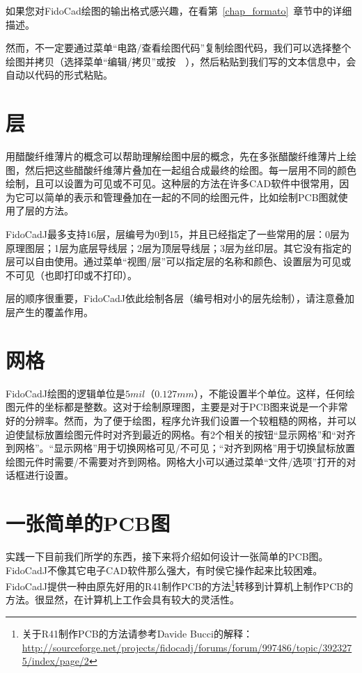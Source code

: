 \documentclass[10pt,a4paper,twoside]{scrreprt}
\newcommand{\keyevidence}[1]{\fbox{#1}}
\begin{document}
如果您对FidoCad绘图的输出格式感兴趣，在看第~\ref{chap_formato}~章节中的详细描述。

然而，不一定要通过菜单{}“电路/查看绘图代码”复制绘图代码，我们可以选择整个绘图并拷贝（选择菜单“编辑/拷贝”或按~\keyevidence{Ctrl+C}~），然后粘贴到我们写的文本信息中，会自动以代码的形式粘贴。

\section{层} %

\label{sec_layer} 
用醋酸纤维薄片的概念可以帮助理解绘图中层的概念，先在多张醋酸纤维薄片上绘图，然后把这些醋酸纤维薄片叠加在一起组合成最终的绘图。每一层用不同的颜色绘制，且可以设置为可见或不可见。这种层的方法在许多CAD软件中很常用，因为它可以简单的表示和管理叠加在一起的不同的绘图元件，比如绘制PCB图就使用了层的方法。

FidoCadJ最多支持16层，层编号为0到15，并且已经指定了一些常用的层：0层为原理图层；1层为底层导线层；2层为顶层导线层；3层为丝印层。其它没有指定的层可以自由使用。通过菜单{}“视图/层”可以指定层的名称和颜色、设置层为可见或不可见（也即打印或不打印）。

层的顺序很重要，FidoCadJ依此绘制各层（编号相对小的层先绘制），请注意叠加层产生的覆盖作用。

\section{网格} %

FidoCadJ绘图的逻辑单位是$5mil$（$0.127mm$），不能设置半个单位。这样，任何绘图元件的坐标都是整数。这对于绘制原理图，主要是对于PCB图来说是一个非常好的分辨率。然而，为了便于绘图，程序允许我们设置一个较粗糙的网格，并可以迫使鼠标放置绘图元件时对齐到最近的网格。有2个相关的按钮{}“显示网格”和{}“对齐到网格”。“显示网格”用于切换网格可见/不可见；“对齐到网格”用于切换鼠标放置绘图元件时需要/不需要对齐到网格。网格大小可以通过菜单“文件/选项”打开的对话框进行设置。

\section{一张简单的PCB图}

实践一下目前我们所学的东西，接下来将介绍如何设计一张简单的PCB图。FidoCadJ不像其它电子CAD软件那么强大，有时侯它操作起来比较困难。FidoCadJ提供一种由原先好用的R41制作PCB的方法\footnote{关于R41制作PCB的方法请参考Davide Bucci的解释：\\ 
\href{http://sourceforge.net/projects/fidocadj/forums/forum/997486/topic/3923275/index/page/2}{http://sourceforge.net/projects/fidocadj/forums/forum/997486/topic/3923275/index/page/2}}转移到计算机上制作PCB的方法。很显然，在计算机上工作会具有较大的灵活性。
\end{document}
